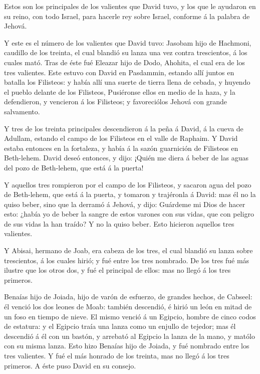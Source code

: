  Estos son los principales de los valientes que David tuvo,
y los que le ayudaron en su reino, con todo Israel, para hacerle rey
sobre Israel, conforme á la palabra de Jehová.

 Y este es el número de los valientes que David tuvo:
Jasobam hijo de Hachmoni, caudillo de los treinta, el cual blandió su
lanza una vez contra trescientos, á los cuales mató.  Tras
de éste fué Eleazar hijo de Dodo, Ahohita, el cual era de los tres
valientes.  Este estuvo con David en Pasdammin, estando
allí juntos en batalla los Filisteos: y había allí una suerte de tierra
llena de cebada, y huyendo el pueblo delante de los Filisteos,
 Pusiéronse ellos en medio de la haza, y la defendieron, y
vencieron á los Filisteos; y favoreciólos Jehová con grande salvamento.

 Y tres de los treinta principales descendieron á la peña á
David, á la cueva de Adullam, estando el campo de los Filisteos en el
valle de Raphaim.  Y David estaba entonces en la fortaleza,
y había á la sazón guarnición de Filisteos en Beth-lehem. 
David deseó entonces, y dijo: ¡Quién me diera á beber de las aguas del
pozo de Beth-lehem, que está á la puerta!

 Y aquellos tres rompieron por el campo de los Filisteos, y
sacaron agua del pozo de Beth-lehem, que está á la puerta, y tomaron y
trajéronla á David: mas él no la quiso beber, sino que la derramó á
Jehová, y dijo:  Guárdeme mi Dios de hacer esto: ¿había yo
de beber la sangre de estos varones con sus vidas, que con peligro de
sus vidas la han traído? Y no la quiso beber. Esto hicieron aquellos
tres valientes.

 Y Abisai, hermano de Joab, era cabeza de los tres, el cual
blandió su lanza sobre trescientos, á los cuales hirió; y fué entre los
tres nombrado.  De los tres fué más ilustre que los otros
dos, y fué el principal de ellos: mas no llegó á los tres primeros.

 Benaías hijo de Joiada, hijo de varón de esfuerzo, de
grandes hechos, de Cabseel: él venció los dos leones de Moab: también
descendió, é hirió un león en mitad de un foso en tiempo de nieve.
 El mismo venció á un Egipcio, hombre de cinco codos de
estatura: y el Egipcio traía una lanza como un enjullo de tejedor; mas
él descendió á él con un bastón, y arrebató al Egipcio la lanza de la
mano, y matólo con su misma lanza.  Esto hizo Benaías hijo
de Joiada, y fué nombrado entre los tres valientes.  Y fué
el más honrado de los treinta, mas no llegó á los tres primeros. A éste
puso David en su consejo.

